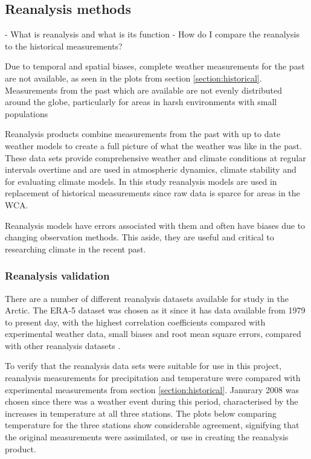 \documentclass[12pt, oneside]{article}
\begin{document}
\subsection{Reanalysis methods}


{\color{blue}- What is reanalysis and what is its function
- How do I compare the reanalysis to the historical measurements?
}

Due to temporal and spatial biases, complete weather measurements for the past are not available, as seen in the plots from section 
\ref{section:historical}. Measurements from the past which are available are not evenly distributed around the globe, particularly for areas in harsh environments with small populations

Reanalysis products combine measurements from the past with up to date weather models to create a full picture of what the weather was like in the past. These data sets provide comprehensive weather and climate conditions at regular intervals overtime and are used in atmospheric dynamics, climate stability and for evaluating climate models. In this study reanalysis models are used in replacement of historical measurements since raw data is sparce for areas in the WCA. 

Reanalysis models have errors associated with them and often have biases due to changing observation methods. This aside, they are useful and critical to researching climate in the recent past. 


\subsubsection{Reanalysis validation}
There are a number of different reanalysis datasets available for study in the Arctic. The ERA-5 dataset was chosen as it since it has data available from 1979 to present day, with the
highest correlation coefficients compared with experimental weather data, small biases and
root mean square errors, compared with other reanalysis datasets \cite{era5,era5veari}. 

To verify that the reanalysis data sets were suitable for use in this project, reanalysis measurements for precipitation and temperature were compared with experimental measurements from section \ref{section:historical}. Janurary 2008 was chosen since there was a weather event during this period, characterised by the increases in temperature at all three stations. The plots below comparing temperature for the three stations show considerable agreement, signifying that the original measurements were assimilated, or use in creating the reanalysis product. 
\end{document}
